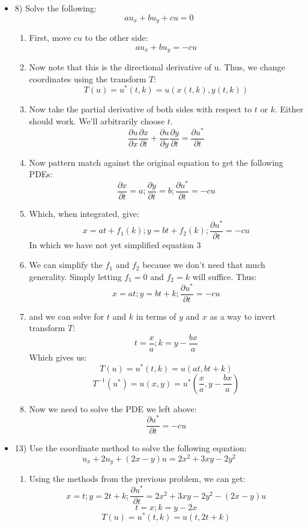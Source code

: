 \documentclass{article}
\begin{document}
\begin{itemize}
    \newpage
    \item 8)
    Solve the following:
    $$au_x + bu_y + cu = 0$$
    \begin{enumerate}
        \item First, move $cu$ to the other side:
        $$au_x + bu_y =  - cu$$
        \item Now note that this is the directional derivative of u.  Thus, we change coordinates using the transform $T$:
        $$T(u) = u^*(t,k) = u(x(t,k),y(t,k))$$
        \item Now take the partial derivative of both sides with respect to $t$ or $k$. Either should work. We'll arbitrarily choose $t$.
        $$\frac{\partial u}{\partial x}\frac{\partial x}{\partial t} + \frac{\partial u}{\partial y}\frac{\partial y}{\partial t} = \frac{\partial u^*}{\partial t}$$
        \item Now pattern match against the original equation to get the following PDEs:
        $$\frac{\partial x}{\partial t} = a;\frac{\partial y}{\partial t} = b;\frac{\partial u^*}{\partial t} = -cu$$
        \item Which, when integrated, give:
        $$x = at + f_1(k);y = bt + f_2(k);\frac{\partial u^*}{\partial t} = -cu$$
        In which we have not yet simplified equation 3
        \item We can simplify the $f_1$ and $f_2$ because we don't need that much generality. Simply letting $f_1 = 0$ and $f_2 = k$ will suffice. Thus:
        $$x = at ;y = bt + k;\frac{\partial u^*}{\partial t} = -cu$$
        \item and we can solve for $t$ and $k$ in terms of $y$ and $x$ as a way to invert transform $T$:
        $$t = \frac{x}{a}; k = y - \frac{bx}{a}$$
        Which gives us: 
        $$T(u) = u^*(t,k) = u(at,bt + k)$$
        $$T^{-1}(u^*) = u(x,y) = u^*(\frac{x}{a},y - \frac{bx}{a})$$
        \item Now we need to solve the PDE we left above:
        $$\frac{\partial u^*}{\partial t} = -cu$$
    \end{enumerate}
    \newpage
    \item 13) Use the coordinate method to solve the following equation:
    $$u_x + 2u_y + (2x-y)u = 2x^2 + 3xy -2y^2$$
    \begin{enumerate}
        \item Using the methods from the previous problem, we can get:
        $$x = t ;y = 2t + k;\frac{\partial u^*}{\partial t} = 2x^2 + 3xy - 2y^2 - (2x-y)u$$
        $$t = x; k = y - 2x$$
        $$T(u) = u^*(t,k) = u(t,2t + k)$$

\end{enumerate}
\end{itemize}
\end{document}

